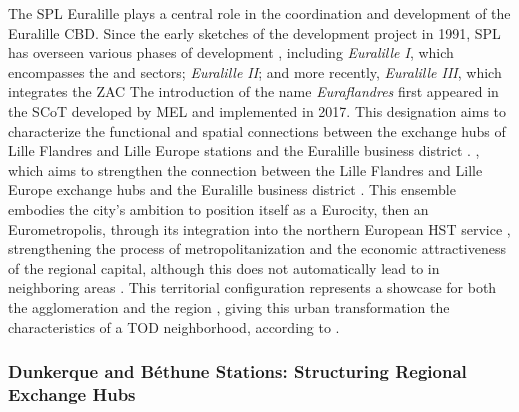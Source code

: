 \begin{refsegment}
{    The \acrshort{SPL} Euralille plays a central role in the coordination and development of the Euralille \acrshort{CBD}. Since the early sketches of the development project in 1991, \acrshort{SPL} has overseen various phases of development \textcolor{blue}{\autocite[]{hayer_fabriquer_2005}}, including \textsl{Euralille I}, which encompasses the   and  sectors; \textsl{Euralille II}; and more recently, \textsl{Euralille III}, which integrates the \acrfull{ZAC}  The introduction of the name \textsl{Euraflandres} first appeared in the \acrshort{SCoT} developed by \acrfull{MEL} and implemented in 2017. This designation aims to characterize the functional and spatial connections between the exchange hubs of Lille Flandres and Lille Europe stations and the Euralille business district \textcolor{blue}{\autocite[71]{adulm_rapport_2017}}.
}, which aims to strengthen the connection between the Lille Flandres and Lille Europe exchange hubs and the Euralille business district \textcolor{blue}{\autocite[71]{adulm_rapport_2017}}. This ensemble embodies the city's ambition to position itself as a Eurocity, then an Eurometropolis, through its integration into the northern European \acrshort{HST} service \textcolor{blue}{\autocite[155]{baron_reseaux_2017}}, strengthening the process of metropolitanization and the economic attractiveness of the regional capital, although this does not automatically lead to  \textcolor{blue}{\autocite[238]{offner__1993}} in neighboring areas \textcolor{blue}{\autocite[109]{chen_wider_2012}}. This  territorial configuration represents a showcase for both the agglomeration and the region \textcolor{blue}{\autocite[2]{heddebaut_city-hubs_2018}}, giving this urban transformation the characteristics of a \acrshort{TOD} neighborhood, according to \textcolor{blue}{\textcite[5]{heddebaut_city-hubs_2018}}.%

\subsubsection*{Dunkerque and Béthune Stations: Structuring Regional Exchange Hubs
    \label{chap3:application-observation-quantitative-dunkerque-bethune}
    }


\end{refsegment}
